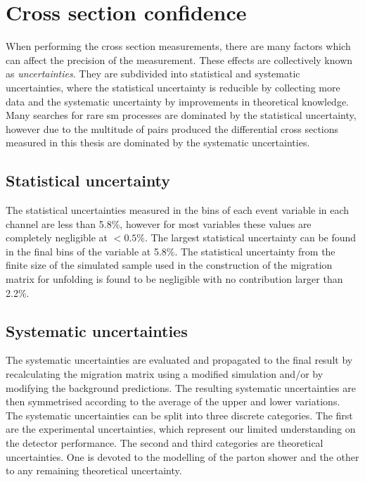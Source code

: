 \chapter{Cross section confidence}
\label{ch:uncertainty}

When performing the cross section measurements, there are many factors which can affect the precision of the measurement. 
These effects are collectively known as \textit{uncertainties}.
They are subdivided into statistical and systematic uncertainties, where the statistical uncertainty is reducible by collecting more data and the systematic uncertainty by improvements in theoretical knowledge.
Many searches for rare \acrshort{sm} processes are dominated by the statistical uncertainty, however due to the multitude of \ttbar{} pairs produced the differential cross sections measured in this thesis are dominated by the systematic uncertainties.

\section{Statistical uncertainty} %
\label{sec:statistical_uncertainty}

The statistical uncertainties measured in the bins of each event variable in each channel are less than 5.8\%, however for most variables these values are completely negligible at $<0.5\%$.
The largest statistical uncertainty can be found in the final bins of the \ptmiss{} variable at 5.8\%.
The statistical uncertainty from the finite size of the simulated \powhegpythia{} sample used in the construction of the migration matrix for unfolding is found to be negligible with no contribution larger than 2.2\%.

\section{Systematic uncertainties} %
\label{sec:systematic_uncertainty}

The systematic uncertainties are evaluated and propagated to the final result by recalculating the migration matrix using a modified \ttbar{} simulation and/or by modifying the background predictions.
The resulting systematic uncertainties are then symmetrised according to the average of the upper and lower variations.
The systematic uncertainties can be split into three discrete categories.
The first are the experimental uncertainties, which represent our limited understanding on the detector performance.
The second and third categories are theoretical uncertainties. 
One is devoted to the modelling of the parton shower and the other to any remaining theoretical uncertainty.

